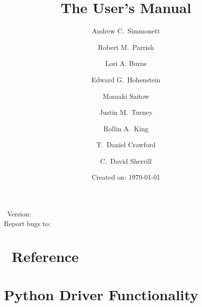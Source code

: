 \documentclass[12pt]{article}
\begin{document}


\title{The \PSIfour User's Manual}
\date{Created on: \today}
%
%
\author{
Andrew C.\ Simmonett
\and Robert M.\ Parrish
\and Lori A. Burns
\and Edward G.\ Hohenstein
\and Masaaki Saitow
\and Justin M.\ Turney
\and Rollin A.\ King
\and T.\ Daniel Crawford
\and C.\ David Sherrill}

\maketitle

\PSIfour\ Version: \PSIversion \\
Report bugs to: \PSIemail \\

\thispagestyle{empty}

\newpage
\tableofcontents
\newpage






  
  
  
  
  
  
%  
  
  
   

%






\appendix
\section{\PSIfour\ Reference}\label{PSI_Reference}





\section{Python Driver Functionality}\label{sphinxpsithon}
 
\end{document}

